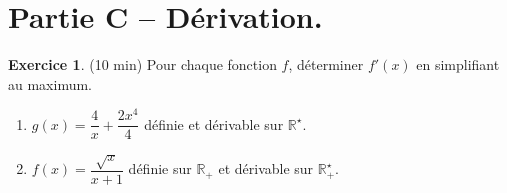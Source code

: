 \documentclass{exam}
\theoremstyle{definition}
\newtheorem{exercice}{Exercice}
\begin{document}
\section*{Partie C -- Dérivation.}

\begin{exercice}{(10 min)}
  Pour chaque fonction $f$, déterminer $f'(x)$ en simplifiant au maximum.
  \begin{enumerate}
    \item $g(x) = \dfrac{4}{x} + \dfrac{2x^4}{4}$ définie et dérivable sur $\mathbb{R}^\star$.
    \item $f(x) = \dfrac{\sqrt{x}}{x + 1}$ définie sur $\mathbb{R}_+$ et dérivable sur $\mathbb{R}_+^\star$.
  \end{enumerate}
\end{exercice}
\end{document}
